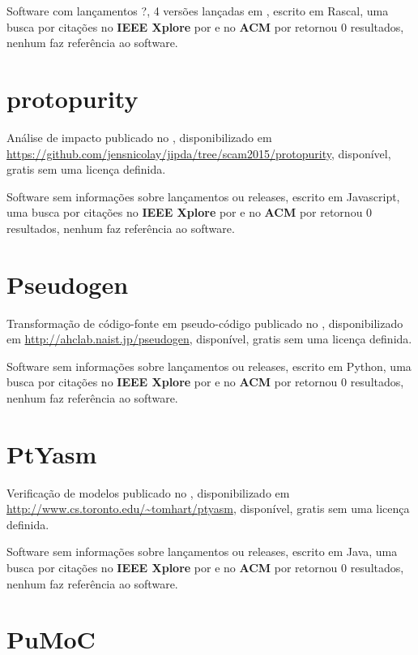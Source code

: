Software com lançamentos ?,
4 versões lançadas
em ,
escrito em Rascal,
uma busca por citações no {\bf IEEE Xplore} por
\texttt{}
e no {\bf ACM} por
\texttt{}
retornou
0 resultados,
nenhum faz referência ao software.



\section{protopurity}

Análise de impacto
publicado no  ,
disponibilizado em \url{https://github.com/jensnicolay/jipda/tree/scam2015/protopurity},
disponível,
gratis
sem uma licença definida.

Software sem informações sobre lançamentos ou releases,
escrito em Javascript,
uma busca por citações no {\bf IEEE Xplore} por
\texttt{}
e no {\bf ACM} por
\texttt{}
retornou
0 resultados,
nenhum faz referência ao software.



\section{Pseudogen}

Transformação de código-fonte em pseudo-código
publicado no  ,
disponibilizado em \url{http://ahclab.naist.jp/pseudogen},
disponível,
gratis
sem uma licença definida.

Software sem informações sobre lançamentos ou releases,
escrito em Python,
uma busca por citações no {\bf IEEE Xplore} por
\texttt{}
e no {\bf ACM} por
\texttt{}
retornou
0 resultados,
nenhum faz referência ao software.



\section{PtYasm}

Verificação de modelos
publicado no  ,
disponibilizado em \url{http://www.cs.toronto.edu/~tomhart/ptyasm},
disponível,
gratis
sem uma licença definida.

Software sem informações sobre lançamentos ou releases,
escrito em Java,
uma busca por citações no {\bf IEEE Xplore} por
\texttt{}
e no {\bf ACM} por
\texttt{}
retornou
0 resultados,
nenhum faz referência ao software.



\section{PuMoC}

